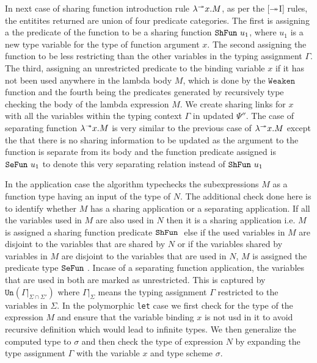 In next case of sharing function introduction rule $\lambda^{\twoheadrightarrow}x.M$, as per the [$\twoheadrightarrow$I] rules, the entitites returned
are union of four predicate categories. The first is assigning a the predicate of the function to be
a sharing function $\texttt{ShFun}\ u_1$, where $u_1$ is a new type variable for the type of function argument $x$.
The second assigning the function to be less restricting than the other variables in the typing assignment $\Gamma$.
The third, assigning an unrestricted predicate to the binding variable $x$ if it has not been used
anywhere in the lambda body $M$, which is done by the $\texttt{Weaken}$ function and the fourth
being the predicates generated by recursively type checking the body of the lambda expression $M$.
We create sharing links for $x$ with all the variables within the typing context $\Gamma$ in updated
$\Psi''$.
The case of separating function $\lambda^{\mathrel{-\mkern-6mu*}} x. M$ is very similar to the previous case of $\lambda^{\twoheadrightarrow}x. M$ except
the that there is no sharing information to be updated as the argument to the function is
separate from its body and the function predicate assigned is $\texttt{SeFun}\ u_1$ to denote this very
separating relation instead of $\texttt{ShFun}\ u_1$

In the application case the algorithm typechecks the subexpressions $M$ as a function type having
an input of the type of $N$. The additional check done here is to identify whether $M$ has a sharing
application or a separating application. If all the variables used in $M$ are also used in $N$ then
it is a sharing application i.e. $M$ is assigned a sharing function predicate $\texttt{ShFun}\ $
else if the used variables in $M$ are disjoint to the variables that
are shared by $N$ or if the variables shared by variables in $M$ are disjoint to the variables
that are used in $N$, $M$ is assigned the predicate type $\texttt{SeFun}\ $. Incase of a separating function
application, the variables that are used in both are marked as unrestricted. This is captured by
$\texttt{Un}(\Gamma|_{\Sigma \cap \Sigma'})$ where $\Gamma|_{\Sigma}$ means the typing assignment $\Gamma$
restricted to the variables in $\Sigma$.
In the polymorphic \texttt{let} case we first check for the type of the expression $M$ and
ensure that the variable binding $x$ is not usd in it to avoid recursive definition which would
lead to infinite types. We then generalize the computed type to $\sigma$ and then check the type of expression $N$
by expanding the type assignment $\Gamma$ with the variable $x$ and type scheme $\sigma$.

